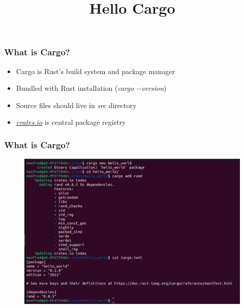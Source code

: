 \documentclass{beamer}
\title{Hello Cargo}
\begin{document}
\begin{frame}

\end{frame}


\begin{frame}
		\frametitle{What is Cargo?}
		\begin{itemize}
			\item Cargo is Rust's build system and package manager
            \vspace{\baselineskip}
			\item Bundled with Rust installation (\textit{cargo -{}-version})
            \vspace{\baselineskip}
			\item Source files should live in \textit{src} directory
            \vspace{\baselineskip}
			\item \href{https://crates.io}{\textit{crates.io}} is central package registry
		\end{itemize}
\end{frame}

\begin{frame}
	\frametitle{What is Cargo?}
    \begin{figure}
        \centering
        \includegraphics[width=0.9\linewidth]{images/cargo-toml}
    \end{figure}
\end{frame}
\end{document}
